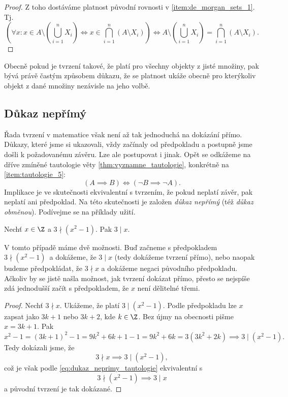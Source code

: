 \begin{proof}
    Z toho dostáváme platnost původní rovnosti v \ref{item:de_morgan_sets_1}. Tj.
    \begin{equation*}
        \left(\forall x : x \in A \setminus \left(\bigcup\limits_{i=1}^{n}{X_i}\right) \iff x\in\bigcap\limits_{i=1}^{n}{(A \setminus X_i)}\right) \iff A \setminus \left(\bigcup\limits_{i=1}^{n}{X_i}\right)=\bigcap\limits_{i=1}^{n}{(A \setminus X_i)}.
    \end{equation*}
\end{proof}
Obecně pokud je tvrzení takové, že platí pro všechny objekty z jisté množiny, pak bývá právě častým způsobem důkazu, že se platnost ukáže obecně pro kterýkoliv objekt z dané množiny nezávisle na jeho volbě.

\subsection{Důkaz nepřímý}\label{subsec:dukaz_neprimy}
Řada tvrzení v matematice však není až tak jednoduchá na dokázání přímo. Důkazy, které jsme si ukazovali, vždy začínaly od předpokladu a postupně jsme došli k požadovanému závěru. Lze ale postupovat i jinak. Opět se odkážeme na dříve zmíněné tautologie věty \ref{thm:vyznamne_tautologie}, konkrétně na \ref{item:tautologie_5}:
\begin{equation}\label{eq:dukaz_neprimy_tautologie}
    (A \implies B) \iff (\neg B \implies \neg A).
\end{equation}
Implikace je ve skutečnosti ekvivalentní s tvrzením, že pokud neplatí závěr, pak neplatí ani předpoklad. Na této skutečnosti je založen \emph{důkaz nepřímý} (též \emph{důkaz obměnou}). Podívejme se na příklady užití.
\begin{proposition}
    Nechť $x\in\Z$ a $3 \nmid (x^2-1)$. Pak $3 \mid x$.
\end{proposition}
V tomto případě máme dvě možnosti. Buď začneme s předpokladem $3 \nmid (x^2-1)$~a dokážeme, že $3 \mid x$ (tedy dokážeme tvrzení přímo), nebo naopak budeme předpokládat, že $3 \nmid x$ a dokážeme negaci původního předpokladu. Ačkoliv by se jistě našla možnost, jak tvrzení dokázat přímo, přesto se nejspíše zdá jednodušší začít s předpokladem, že $x$ není dělitelné třemi.
\begin{proof}
    Nechť $3 \nmid x$. Ukážeme, že platí $3 \mid (x^2-1)$. Podle předpokladu lze $x$ zapsat jako $3k+1$ nebo $3k+2$, kde $k\in\Z$. Bez újmy na obecnosti pišme $x=3k+1$. Pak
    \begin{equation*}
        x^2-1=(3k+1)^2-1=9k^2+6k+1-1=9k^2+6k=3(3k^2+2k)\implies 3 \mid (x^2-1).
    \end{equation*}
    Tedy dokázali jsme, že
    \begin{equation*}
        3 \nmid x \implies 3 \mid (x^2-1),
    \end{equation*}
    což je však podle \ref{eq:dukaz_neprimy_tautologie} ekvivalentní s
    \begin{equation*}
        3 \nmid (x^2-1) \implies 3 \mid x
    \end{equation*}
    a původní tvrzení je tak dokázané.
\end{proof}
